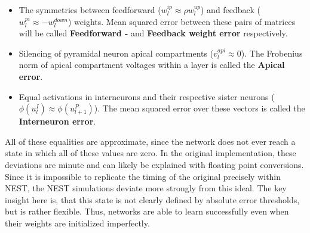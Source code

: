 \begin{itemize}
  \item The symmetries between feedforward ($w_l^{ip} \approx \rho w_l^{up}$) and feedback ($w_l^{pi} \approx
          -w_l^{down}$) weights. Mean squared error between these pairs of matrices will be called \textbf{Feedforward -
        } and \textbf{Feedback weight error} respectively.
  \item Silencing of pyramidal neuron apical compartments ($v_l^{api} \approx 0$). The Frobenius norm \citeme of apical
        compartment voltages within a layer is called the \textbf{Apical error}.
  \item Equal activations in interneurons and their respective sister neurons ($\phi (u_l^I) \approx \phi (u_{l+1}^P)$).
        The mean squared error over these vectors is called the \textbf{Interneuron error}.
\end{itemize}


All of these equalities are approximate, since the network does not ever reach a state in which all of these values are
zero. In the original implementation, these deviations are minute and can likely be explained with floating point
conversions. Since it is impossible to replicate the timing of the original precisely within NEST, the NEST simulations
deviate more strongly from this ideal. The key insight here is, that this state is not clearly defined by absolute error
thresholds, but is rather flexible. Thus, networks are able to learn successfully even when their weights are
initialized imperfectly. 

